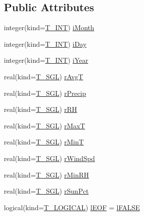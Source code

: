 \subsection*{Public Attributes}
\begin{DoxyCompactItemize}
\item 
integer(kind=\hyperlink{namespacetest_a6f91ebd89b58cfcc5da99faed9385c1e}{T\_\-INT}) \hyperlink{typetest_1_1_t___t_i_m_e___s_e_r_i_e_s___f_i_l_e_af3bb4f43dc9820f71e9d2c444d096238}{iMonth}
\item 
integer(kind=\hyperlink{namespacetest_a6f91ebd89b58cfcc5da99faed9385c1e}{T\_\-INT}) \hyperlink{typetest_1_1_t___t_i_m_e___s_e_r_i_e_s___f_i_l_e_a58e043b9d803e42f5b5a7af45595cd03}{iDay}
\item 
integer(kind=\hyperlink{namespacetest_a6f91ebd89b58cfcc5da99faed9385c1e}{T\_\-INT}) \hyperlink{typetest_1_1_t___t_i_m_e___s_e_r_i_e_s___f_i_l_e_ad6e179a39ffec0e57a9afcc9af05c9c9}{iYear}
\item 
real(kind=\hyperlink{namespacetest_a04d8b9090502de3a00046fe904bc3d99}{T\_\-SGL}) \hyperlink{typetest_1_1_t___t_i_m_e___s_e_r_i_e_s___f_i_l_e_a29183a336282e5d7d79cbe233a956ad6}{rAvgT}
\item 
real(kind=\hyperlink{namespacetest_a04d8b9090502de3a00046fe904bc3d99}{T\_\-SGL}) \hyperlink{typetest_1_1_t___t_i_m_e___s_e_r_i_e_s___f_i_l_e_a9b16b0e46a33aa55f66a6ee4105e7be5}{rPrecip}
\item 
real(kind=\hyperlink{namespacetest_a04d8b9090502de3a00046fe904bc3d99}{T\_\-SGL}) \hyperlink{typetest_1_1_t___t_i_m_e___s_e_r_i_e_s___f_i_l_e_a57f4233be721cd6d4d61f5c90c161c9e}{rRH}
\item 
real(kind=\hyperlink{namespacetest_a04d8b9090502de3a00046fe904bc3d99}{T\_\-SGL}) \hyperlink{typetest_1_1_t___t_i_m_e___s_e_r_i_e_s___f_i_l_e_af487847ca7e5b7ec6130cd41ca895366}{rMaxT}
\item 
real(kind=\hyperlink{namespacetest_a04d8b9090502de3a00046fe904bc3d99}{T\_\-SGL}) \hyperlink{typetest_1_1_t___t_i_m_e___s_e_r_i_e_s___f_i_l_e_a277d6f205ff7105aa099671bc6bcb645}{rMinT}
\item 
real(kind=\hyperlink{namespacetest_a04d8b9090502de3a00046fe904bc3d99}{T\_\-SGL}) \hyperlink{typetest_1_1_t___t_i_m_e___s_e_r_i_e_s___f_i_l_e_acd05ec22cf5b09f8a2601f129525b7f0}{rWindSpd}
\item 
real(kind=\hyperlink{namespacetest_a04d8b9090502de3a00046fe904bc3d99}{T\_\-SGL}) \hyperlink{typetest_1_1_t___t_i_m_e___s_e_r_i_e_s___f_i_l_e_a43f6372633d5ab123055a1f67f7a42fc}{rMinRH}
\item 
real(kind=\hyperlink{namespacetest_a04d8b9090502de3a00046fe904bc3d99}{T\_\-SGL}) \hyperlink{typetest_1_1_t___t_i_m_e___s_e_r_i_e_s___f_i_l_e_a53074457d40b13272137b9e2347db9a5}{rSunPct}
\item 
logical(kind=\hyperlink{namespacetest_acdeac586276a7d1d394fb5eddc77fc3d}{T\_\-LOGICAL}) \hyperlink{typetest_1_1_t___t_i_m_e___s_e_r_i_e_s___f_i_l_e_af18a995158aea97aae702dd2a0d7bfe5}{lEOF} = \hyperlink{namespacetest_ad44869e0204417021792170cd610ee25}{lFALSE}
\end{DoxyCompactItemize}


